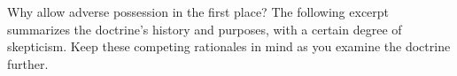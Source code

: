 Why allow adverse possession in the first place? The following excerpt
%
summarizes the doctrine's history and purposes, with a certain degree of
skepticism. Keep these competing rationales in mind as you examine the doctrine
further.

